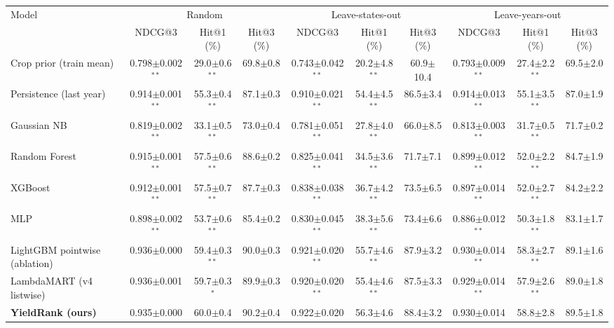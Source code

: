 \begin{tabular}{lccccccccc}
\toprule
Model & \multicolumn{3}{c}{Random} & \multicolumn{3}{c}{Leave-states-out} & \multicolumn{3}{c}{Leave-years-out} \\
\cmidrule(lr){2-4}\cmidrule(lr){5-7}\cmidrule(lr){8-10}
 & NDCG@3 & Hit@1 (\%) & Hit@3 (\%) & NDCG@3 & Hit@1 (\%) & Hit@3 (\%) & NDCG@3 & Hit@1 (\%) & Hit@3 (\%) \\
\midrule
Crop prior (train mean) & 0.798$\pm$0.002$^{**}$ & 29.0$\pm$0.6$^{**}$ & 69.8$\pm$0.8 & 0.743$\pm$0.042$^{**}$ & 20.2$\pm$4.8$^{**}$ & 60.9$\pm$10.4 & 0.793$\pm$0.009$^{**}$ & 27.4$\pm$2.2$^{**}$ & 69.5$\pm$2.0 \\
Persistence (last year) & 0.914$\pm$0.001$^{**}$ & 55.3$\pm$0.4$^{**}$ & 87.1$\pm$0.3 & 0.910$\pm$0.021$^{**}$ & 54.4$\pm$4.5$^{**}$ & 86.5$\pm$3.4 & 0.914$\pm$0.013$^{**}$ & 55.1$\pm$3.5$^{**}$ & 87.0$\pm$1.9 \\
Gaussian NB~\cite{pudumalar2017,elbasi2023} & 0.819$\pm$0.002$^{**}$ & 33.1$\pm$0.5$^{**}$ & 73.0$\pm$0.4 & 0.781$\pm$0.051$^{**}$ & 27.8$\pm$4.0$^{**}$ & 66.0$\pm$8.5 & 0.813$\pm$0.003$^{**}$ & 31.7$\pm$0.5$^{**}$ & 71.7$\pm$0.2 \\
Random Forest~\cite{kulkarni2018,breiman2001} & 0.915$\pm$0.001$^{**}$ & 57.5$\pm$0.6$^{**}$ & 88.6$\pm$0.2 & 0.825$\pm$0.041$^{**}$ & 34.5$\pm$3.6$^{**}$ & 71.7$\pm$7.1 & 0.899$\pm$0.012$^{**}$ & 52.0$\pm$2.2$^{**}$ & 84.7$\pm$1.9 \\
XGBoost~\cite{dey2024,chen2016} & 0.912$\pm$0.001$^{**}$ & 57.5$\pm$0.7$^{**}$ & 87.7$\pm$0.3 & 0.838$\pm$0.038$^{**}$ & 36.7$\pm$4.2$^{**}$ & 73.5$\pm$6.5 & 0.897$\pm$0.014$^{**}$ & 52.0$\pm$2.7$^{**}$ & 84.2$\pm$2.2 \\
MLP~\cite{musanase2023} & 0.898$\pm$0.002$^{**}$ & 53.7$\pm$0.6$^{**}$ & 85.4$\pm$0.2 & 0.830$\pm$0.045$^{**}$ & 38.3$\pm$5.6$^{**}$ & 73.4$\pm$6.6 & 0.886$\pm$0.012$^{**}$ & 50.3$\pm$1.8$^{**}$ & 83.1$\pm$1.7 \\
\midrule
LightGBM pointwise (ablation) & 0.936$\pm$0.000 & 59.4$\pm$0.3$^{**}$ & 90.0$\pm$0.3 & 0.921$\pm$0.020$^{**}$ & 55.7$\pm$4.6$^{**}$ & 87.9$\pm$3.2 & 0.930$\pm$0.014$^{**}$ & 58.3$\pm$2.7$^{**}$ & 89.1$\pm$1.6 \\
LambdaMART (v4 listwise) & 0.936$\pm$0.001 & 59.7$\pm$0.3$^{*}$ & 89.9$\pm$0.3 & 0.920$\pm$0.020$^{**}$ & 55.4$\pm$4.6$^{**}$ & 87.5$\pm$3.3 & 0.929$\pm$0.014$^{**}$ & 57.9$\pm$2.6$^{**}$ & 89.0$\pm$1.8 \\
\textbf{YieldRank (ours)} & 0.935$\pm$0.000 & 60.0$\pm$0.4 & 90.2$\pm$0.4 & 0.922$\pm$0.020 & 56.3$\pm$4.6 & 88.4$\pm$3.2 & 0.930$\pm$0.014 & 58.8$\pm$2.8 & 89.5$\pm$1.8 \\
\bottomrule
\end{tabular}

